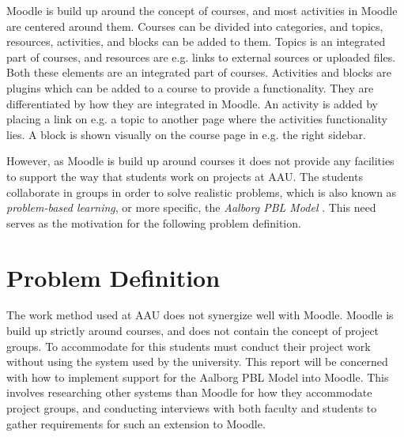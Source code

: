 Moodle is build up around the concept of courses, and most activities in Moodle are centered around them. 
Courses can be divided into categories, and topics, resources, activities, and blocks can be added to them. 
Topics is an integrated part of courses, and resources are e.g. links to external sources or uploaded files. 
Both these elements are an integrated part of courses. Activities and blocks are plugins which can be added to a course to provide a functionality. They are differentiated by how they are integrated in Moodle. An activity is added by placing a link on e.g. a topic to another page where the activities functionality lies. A block is shown visually on the course page in e.g. the right sidebar. 


However, as Moodle is build up around courses it does not provide any facilities to support the way that students work on projects at AAU. The students collaborate in groups in order to solve realistic problems, which is also known as \emph{problem-based learning}, or more specific, the \emph{Aalborg PBL Model} \citep{pbl}. This need serves as the motivation for the following problem definition.

\section{Problem Definition}
The work method used at AAU does not synergize well with Moodle. Moodle is build up strictly around courses, and does not contain the concept of project groups. To accommodate for this students must conduct their project work without using the system used by the university. This report will be concerned with how to implement support for the Aalborg PBL Model into Moodle. This involves researching other systems than Moodle for how they accommodate project groups, and conducting interviews with both faculty and students to gather requirements for such an extension to Moodle.